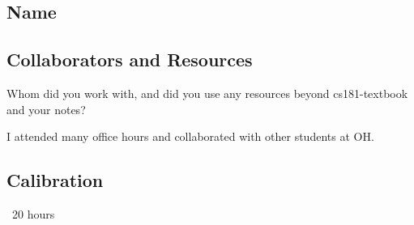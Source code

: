 \documentclass[submit]{harvardml}
\begin{document}
\subsection*{Name}

\subsection*{Collaborators and Resources}
Whom did you work with, and did you use any resources beyond cs181-textbook and your notes?

I attended many office hours and collaborated with other students at OH.

\subsection*{Calibration}
~20 hours 
            
\end{document}
